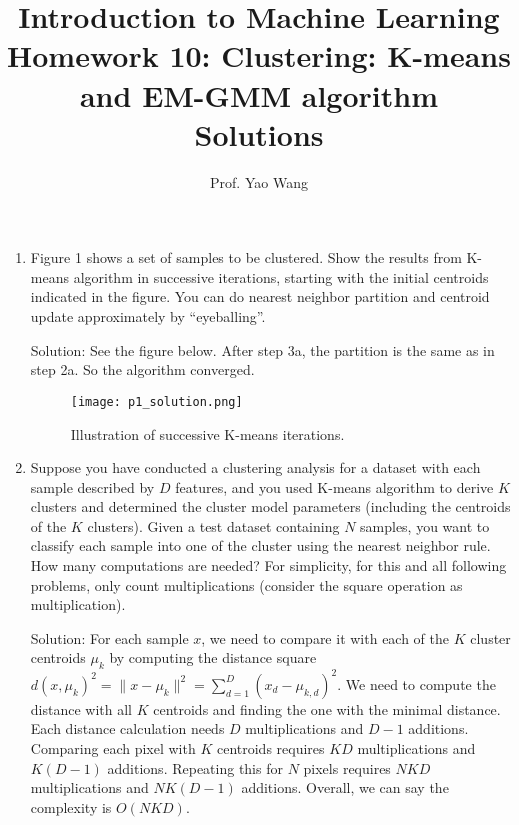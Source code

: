 \documentclass[11pt]{article}
\begin{document}
\title{Introduction to Machine Learning\\
Homework 10: Clustering: K-means and EM-GMM algorithm \\ Solutions}
\author{Prof. Yao Wang}
\date{}

\maketitle

\begin{enumerate}

\item Figure 1 shows a set of samples to be clustered. Show the results from K-means algorithm in successive iterations, starting with the initial centroids indicated in the figure. You can do nearest neighbor partition and centroid update approximately by ``eyeballing''. 

Solution: See the figure below. After step 3a, the partition is the same as in step 2a. So the algorithm converged.

\begin{figure*}[h]
\centering
\texttt{[image: p1\_solution.png]}
\caption{Illustration of successive K-means iterations.} \label{fig:samples}
\end{figure*}

 
 \item\label{kmeans-NN}
 Suppose you have conducted a clustering analysis for a dataset with each sample described by $D$ features, and you used K-means algorithm to derive $K$ clusters and determined the cluster model parameters (including the centroids of the $K$ clusters). Given a test dataset containing $N$ samples,  you want to classify each sample into one of the cluster using the nearest neighbor rule. How many computations are needed? For simplicity, for this and all following problems, only count multiplications (consider the square operation as  multiplication).

 
 Solution: For each sample $x$, we need to compare it with each of the $K$ cluster centroids $\mu_k$ by computing the distance square $d(x, \mu_k)^2=\|x-\mu_k\|^2 =\sum_{d=1}^D (x_d-\mu_{k,d})^2$. We need to compute the distance with all $K$ centroids and finding the one with the minimal distance. Each distance calculation needs $D$ multiplications and $D-1$ additions. Comparing each pixel with $K$ centroids requires $KD$ multiplications and $K(D-1)$ additions. Repeating this for  $N$ pixels requires $NK D$ multiplications and $NK (D-1)$ additions. Overall, we can say the complexity is $O(NKD).$
 

\end{enumerate}
\end{document}
